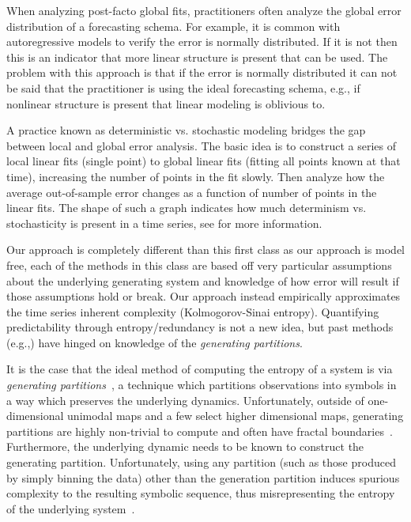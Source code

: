 


When analyzing post-facto global fits, practitioners often analyze the global error distribution of a forecasting schema. For example, it is common with autoregressive models to verify the error is normally distributed. If it is not then this is an indicator that more linear structure is present that can be used. The problem with this approach is that if the error is normally distributed it can not be said that the practitioner is using the ideal forecasting schema, e.g., if nonlinear structure is present that linear modeling is oblivious to. 


A practice known as deterministic vs. stochastic modeling\cite{Casdagli92dvsplots, weigend-book} bridges the gap between local and global error analysis. The basic idea is to construct a series of local linear fits (single point) to global linear fits (fitting all points known at that time), increasing the number of points in the fit slowly. Then analyze how the average out-of-sample error changes as a function of number of points in the linear fits. The shape of such a graph indicates how much determinism vs. stochasticity is present in a time series, see  \cite{Casdagli92dvsplots, weigend-book} for more information. 

 Our approach is completely different than this first class as our approach is model free, each of the methods in this class are based off very particular assumptions about the underlying generating system and knowledge of how error will result if those assumptions hold or break. Our approach instead empirically approximates the time series inherent complexity (Kolmogorov-Sinai entropy). Quantifying predictability through entropy/redundancy is not a new idea, but past methods (e.g.,\cite{Shannon1951, mantegna1994linguistic}) have hinged on knowledge of the  \emph{generating partitions}. 
 
It is the case that the ideal method of computing the entropy of a system is via \emph{generating partitions}~\cite{lind95}, a technique which partitions observations into symbols in a way which preserves the underlying dynamics. Unfortunately, outside of one-dimensional unimodal maps and a few select higher dimensional maps, generating partitions are highly non-trivial to compute and often have fractal boundaries~\cite{eisele1999}. Furthermore, the underlying dynamic needs to be known to construct the generating partition. Unfortunately, using any partition (such as those produced by simply binning the data) other than the generation partition induces spurious complexity to the resulting symbolic sequence, thus misrepresenting the entropy of the underlying system~\cite{bollt2001}.

